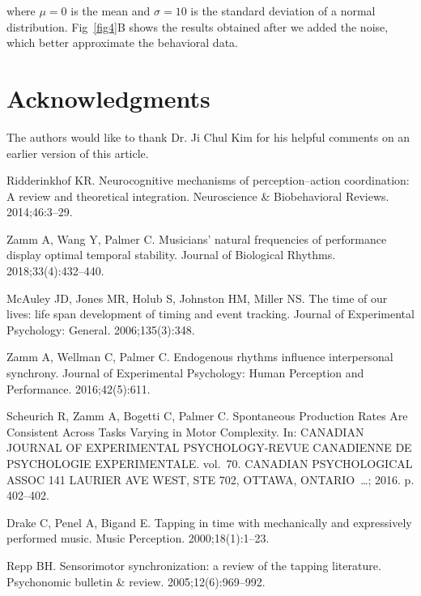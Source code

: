 \documentclass[10pt,letterpaper]{article}
\begin{document}
where $\mu=0$ is the mean and $\sigma=10$ is the standard deviation of a normal distribution. Fig~\ref{fig4}B shows the results obtained after we added the noise, which better approximate the behavioral data.

\section*{Acknowledgments}
The authors would like to thank Dr. Ji Chul Kim for his helpful comments on an earlier version of this article.

\nolinenumbers

\begin{thebibliography}{10}

Ridderinkhof KR.
\newblock Neurocognitive mechanisms of perception--action coordination: A
  review and theoretical integration.
\newblock Neuroscience \& Biobehavioral Reviews. 2014;46:3--29.

Zamm A, Wang Y, Palmer C.
\newblock Musicians' natural frequencies of performance display optimal
  temporal stability.
\newblock Journal of Biological Rhythms. 2018;33(4):432--440.

McAuley JD, Jones MR, Holub S, Johnston HM, Miller NS.
\newblock The time of our lives: life span development of timing and event
  tracking.
\newblock Journal of Experimental Psychology: General. 2006;135(3):348.

Zamm A, Wellman C, Palmer C.
\newblock Endogenous rhythms influence interpersonal synchrony.
\newblock Journal of Experimental Psychology: Human Perception and Performance.
  2016;42(5):611.

Scheurich R, Zamm A, Bogetti C, Palmer C.
\newblock Spontaneous Production Rates Are Consistent Across Tasks Varying in
  Motor Complexity.
\newblock In: CANADIAN JOURNAL OF EXPERIMENTAL PSYCHOLOGY-REVUE CANADIENNE DE
  PSYCHOLOGIE EXPERIMENTALE. vol.~70. CANADIAN PSYCHOLOGICAL ASSOC 141 LAURIER
  AVE WEST, STE 702, OTTAWA, ONTARIO~…; 2016. p. 402--402.

Drake C, Penel A, Bigand E.
\newblock Tapping in time with mechanically and expressively performed music.
\newblock Music Perception. 2000;18(1):1--23.

Repp BH.
\newblock Sensorimotor synchronization: a review of the tapping literature.
\newblock Psychonomic bulletin \& review. 2005;12(6):969--992.


\end{thebibliography}
\end{document}
